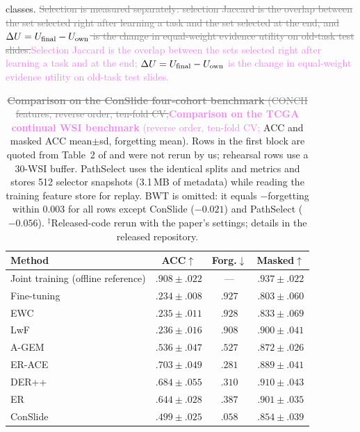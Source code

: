 \documentclass{article}
\newif\ifmarkup \markuptrue
\newcommand{\repc}[3]{\ifmarkup\textcolor{gray}{\sout{#2}}\textcolor{#1}{#3}\else#3\fi}
\newcommand{\repP}[2]{\repc{violet}{#1}{#2}}  %
\begin{document}
classes. \repP{Selection is measured separately: selection Jaccard is the overlap between the set selected right after learning a task and the set selected at the end, and $\Delta U=U_{\rm final}-U_{\rm own}$ is the change in equal-weight evidence utility on old-task test slides.}{Selection Jaccard is the overlap between the sets selected right after learning a task and at the end; $\Delta U=U_{\rm final}-U_{\rm own}$ is the change in equal-weight evidence utility on old-task test slides.}

\begin{table}[!t]
\centering\footnotesize\renewcommand{\arraystretch}{0.93}
\setlength{\tabcolsep}{3.5pt}
\caption{\protect\repP{\textbf{Comparison on the ConSlide four-cohort benchmark} \cite{huang2023conslide} (CONCH features, reverse order, ten-fold CV;}{\textbf{Comparison on the TCGA continual WSI benchmark} (reverse order, ten-fold CV;} ACC and masked ACC mean$\pm$sd, forgetting mean). Rows in the first block are quoted from Table~2 of \cite{gou2025qpmil} and were not rerun by us; rehearsal rows use a 30-WSI buffer. PathSelect uses the identical splits and metrics and stores 512 selector snapshots (3.1\,MB of metadata) while reading the training feature store for replay. BWT is omitted: it equals $-$forgetting within $0.003$ for all rows except ConSlide ($-0.021$) and PathSelect ($-0.056$). $^\ddagger$Released-code rerun with the paper's settings; details in the released repository.}
\label{tab:sota}
\begin{tabular}{lccc}
\toprule
Method & ACC$\uparrow$ & Forg.$\downarrow$ & Masked$\uparrow$ \\
\midrule
Joint training (offline reference) & $.908{\pm}.022$ & --- & $.937{\pm}.022$ \\
Fine-tuning & $.234{\pm}.008$ & $.927$ & $.803{\pm}.060$ \\
EWC \cite{kirkpatrick2017ewc} & $.235{\pm}.011$ & $.928$ & $.833{\pm}.069$ \\
LwF \cite{li2017lwf} & $.236{\pm}.016$ & $.908$ & $.900{\pm}.041$ \\
A-GEM \cite{chaudhry2019agem} & $.536{\pm}.047$ & $.527$ & $.872{\pm}.026$ \\
ER-ACE \cite{caccia2022erace} & $.703{\pm}.049$ & $.281$ & $.889{\pm}.041$ \\
DER++ \cite{buzzega2020derpp} & $.684{\pm}.055$ & $.310$ & $.910{\pm}.043$ \\
ER \cite{chaudhry2019er} & $.644{\pm}.028$ & $.387$ & $.901{\pm}.035$ \\
ConSlide \cite{huang2023conslide} & $.499{\pm}.025$ & $.058$ & $.854{\pm}.039$ \\

\end{tabular}
\end{table}
\end{document}

